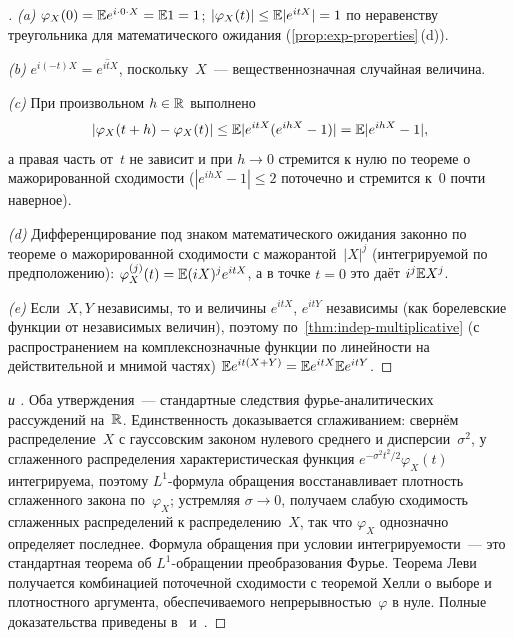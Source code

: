 \begin{proof}[]
\emph{(a)} $\varphi_X(0) = \mathbb{E} e^{i \cdot 0 \cdot X} = \mathbb{E} 1 = 1$; $|\varphi_X(t)| \leq \mathbb{E} |e^{itX}| = 1$ по неравенству треугольника для математического ожидания (\cref{prop:exp-properties}\,(d)).

\emph{(b)} $e^{i(-t)X} = \overline{e^{itX}}$, поскольку~$X$~--- вещественнозначная случайная величина.

\emph{(c)} При произвольном $h \in \mathbb{R}$ выполнено
\[
  |\varphi_X(t + h) - \varphi_X(t)| \leq \mathbb{E} |e^{itX} (e^{ihX} - 1)| = \mathbb{E} |e^{ihX} - 1|,
\]
а правая часть от~$t$ не зависит и при $h \to 0$ стремится к нулю по теореме о мажорированной сходимости ($|e^{ihX} - 1| \leq 2$ поточечно и стремится к~$0$ почти наверное).

\emph{(d)} Дифференцирование под знаком математического ожидания законно по теореме о мажорированной сходимости с мажорантой~$|X|^j$ (интегрируемой по предположению): $\varphi_X^{(j)}(t) = \mathbb{E} (iX)^j e^{itX}$, а в точке $t = 0$ это даёт $i^j \mathbb{E} X^j$.

\emph{(e)} Если~$X, Y$ независимы, то и величины $e^{itX}$, $e^{itY}$ независимы (как борелевские функции от независимых величин), поэтому по~\cref{thm:indep-multiplicative} (с распространением на комплекснозначные функции по линейности на действительной и мнимой частях) $\mathbb{E} e^{it(X + Y)} = \mathbb{E} e^{itX} \mathbb{E} e^{itY}$.
\end{proof}

\begin{proof}[ и ]
Оба утверждения~--- стандартные следствия фурье-аналитических рассуждений на~$\mathbb{R}$. Единственность доказывается сглаживанием: свернём распределение~$X$ с гауссовским законом нулевого среднего и дисперсии~$\sigma^2$, у сглаженного распределения характеристическая функция $e^{-\sigma^2 t^2 / 2} \varphi_X(t)$ интегрируема, поэтому $L^1$-формула обращения восстанавливает плотность сглаженного закона по~$\varphi_X$; устремляя $\sigma \to 0$, получаем слабую сходимость сглаженных распределений к распределению~$X$, так что $\varphi_X$ однозначно определяет последнее. Формула обращения при условии интегрируемости~--- это стандартная теорема об $L^1$-обращении преобразования Фурье. Теорема Леви получается комбинацией поточечной сходимости с теоремой Хелли о выборе и плотностного аргумента, обеспечиваемого непрерывностью~$\varphi$ в нуле. Полные доказательства приведены в~\cite[гл.~II, \S~12]{Shiryaev1989} и~\cite[гл.~VIII]{Gnedenko2001}.
\end{proof}

